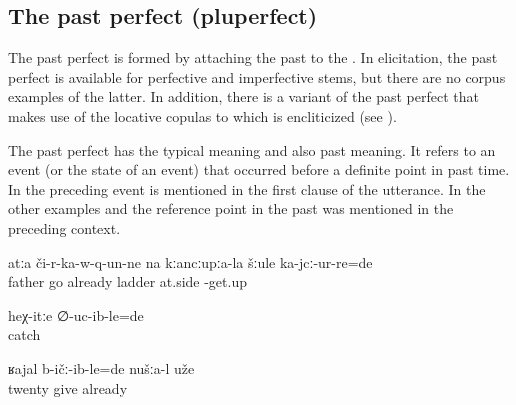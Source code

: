 
\subsection{The past perfect (pluperfect)}
\label{ssec:The past perfect (pluperfect)}

The past perfect is formed by attaching the past   to the . In elicitation, the past perfect is available for perfective and imperfective stems, but there are no corpus examples of the latter. In addition, there is a variant of the past perfect that makes use of the locative copulas to which  is encliticized (see ). 

The past perfect has the typical  meaning and also past  meaning. It refers to an event (or the  state of an event) that occurred before a definite point in past time. In  the preceding event is mentioned in the first clause of the utterance. In the other examples  and  the reference point in the past was mentioned in the preceding context.

\begin{exe}
	\ex	\label{ex:‎‎The father came down and stood next to the ladder analytic}
	\gll	atːa	či-r-ka-w-q-un-ne	na	kːancːupːa-la	šːule	ka-jcː-ur-re=de\\
		father	go	already	ladder	at.side	-get.up\\
	\glt	{}

	\ex	\label{ex:Like this (he) had caught (me) analytic}
	\gll	heχ-itːe	∅-uc-ib-le=de\\
			catch\\
	\glt	{}

	\ex	\label{ex:‎‎‎We had already given twenty analytic}
	\gll	ʁajal	b-ičː-ib-le=de	nušːa-l	uže\\
		twenty	give		already\\
	\glt	{}
\end{exe}

